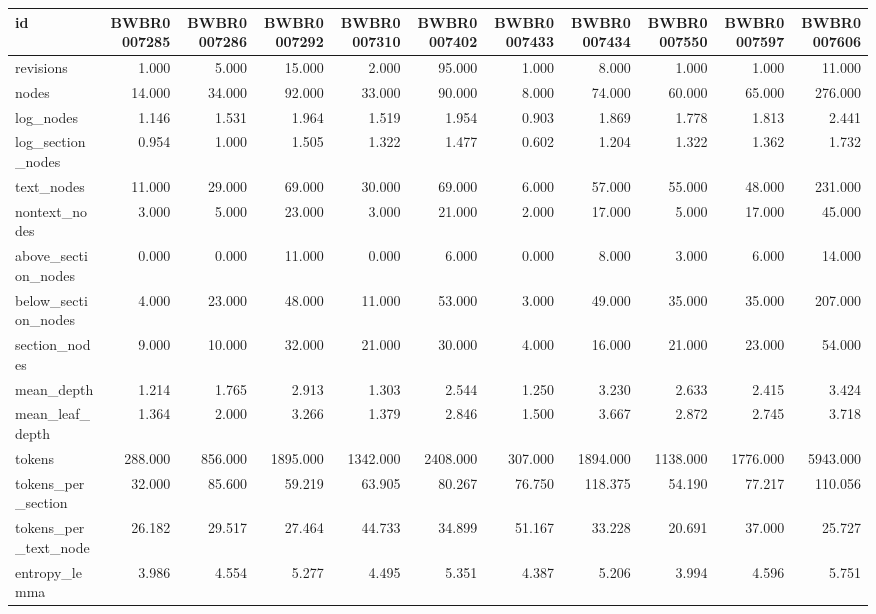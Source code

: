 \begin{tabular}{lrrrrrrrrrr}
\toprule
id & BWBR0007285 & BWBR0007286 & BWBR0007292 & BWBR0007310 & BWBR0007402 & BWBR0007433 & BWBR0007434 & BWBR0007550 & BWBR0007597 & BWBR0007606 \\
\midrule
revisions & 1.000 & 5.000 & 15.000 & 2.000 & 95.000 & 1.000 & 8.000 & 1.000 & 1.000 & 11.000 \\
\cline{1-11}
nodes & 14.000 & 34.000 & 92.000 & 33.000 & 90.000 & 8.000 & 74.000 & 60.000 & 65.000 & 276.000 \\
\cline{1-11}
log\_nodes & 1.146 & 1.531 & 1.964 & 1.519 & 1.954 & 0.903 & 1.869 & 1.778 & 1.813 & 2.441 \\
\cline{1-11}
log\_section\_nodes & 0.954 & 1.000 & 1.505 & 1.322 & 1.477 & 0.602 & 1.204 & 1.322 & 1.362 & 1.732 \\
\cline{1-11}
text\_nodes & 11.000 & 29.000 & 69.000 & 30.000 & 69.000 & 6.000 & 57.000 & 55.000 & 48.000 & 231.000 \\
\cline{1-11}
nontext\_nodes & 3.000 & 5.000 & 23.000 & 3.000 & 21.000 & 2.000 & 17.000 & 5.000 & 17.000 & 45.000 \\
\cline{1-11}
above\_section\_nodes & 0.000 & 0.000 & 11.000 & 0.000 & 6.000 & 0.000 & 8.000 & 3.000 & 6.000 & 14.000 \\
\cline{1-11}
below\_section\_nodes & 4.000 & 23.000 & 48.000 & 11.000 & 53.000 & 3.000 & 49.000 & 35.000 & 35.000 & 207.000 \\
\cline{1-11}
section\_nodes & 9.000 & 10.000 & 32.000 & 21.000 & 30.000 & 4.000 & 16.000 & 21.000 & 23.000 & 54.000 \\
\cline{1-11}
mean\_depth & 1.214 & 1.765 & 2.913 & 1.303 & 2.544 & 1.250 & 3.230 & 2.633 & 2.415 & 3.424 \\
\cline{1-11}
mean\_leaf\_depth & 1.364 & 2.000 & 3.266 & 1.379 & 2.846 & 1.500 & 3.667 & 2.872 & 2.745 & 3.718 \\
\cline{1-11}
tokens & 288.000 & 856.000 & 1895.000 & 1342.000 & 2408.000 & 307.000 & 1894.000 & 1138.000 & 1776.000 & 5943.000 \\
\cline{1-11}
tokens\_per\_section & 32.000 & 85.600 & 59.219 & 63.905 & 80.267 & 76.750 & 118.375 & 54.190 & 77.217 & 110.056 \\
\cline{1-11}
tokens\_per\_text\_node & 26.182 & 29.517 & 27.464 & 44.733 & 34.899 & 51.167 & 33.228 & 20.691 & 37.000 & 25.727 \\
\cline{1-11}
entropy\_lemma & 3.986 & 4.554 & 5.277 & 4.495 & 5.351 & 4.387 & 5.206 & 3.994 & 4.596 & 5.751 \\

\end{tabular}

